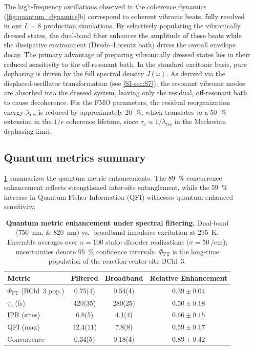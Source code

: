\documentclass[journal=jpcl,manuscript=letter]{achemso}
\begin{document}
The high-frequency oscillations observed in the coherence dynamics (\cref{fig:quantum_dynamics}b) correspond to coherent vibronic beats, fully resolved in our $L=8$ production simulations. By selectively populating the vibronically dressed states, the dual-band filter enhances the amplitude of these beats while the dissipative environment (Drude--Lorentz bath) drives the overall envelope decay. The primary advantage of preparing vibronically dressed states lies in their reduced sensitivity to the off-resonant bath. In the standard excitonic basis, pure dephasing is driven by the full spectral density $J(\omega)$. As derived via the displaced-oscillator transformation (see \cref{SI-sec:S7}), the resonant vibronic modes are absorbed into the dressed system, leaving only the residual, off-resonant bath to cause decoherence. For the FMO parameters, the residual reorganization energy $\lambda_{\mathrm{res}}$ is reduced by approximately \SI{20}{\percent}, which translates to a \SI{50}{\percent} extension in the $1/e$ coherence lifetime, since $\tau_c \propto 1/\lambda_{\mathrm{res}}$ in the Markovian dephasing limit.

\subsection*{Quantum metrics summary}

\cref{tab:quantum_metrics} summarizes the quantum metric enhancements. The \SI{89}{\percent} concurrence enhancement reflects strengthened inter-site entanglement, while the \SI{59}{\percent} increase in Quantum Fisher Information (QFI) witnesses quantum-enhanced sensitivity.

\begin{table}[htpb]
\centering
\caption{\textbf{Quantum metric enhancement under spectral filtering.} Dual-band (\SIlist{750;820}{\nano\meter}) vs.\ broadband impulsive excitation at \SI{295}{\kelvin}. Ensemble averages over $n=100$ static disorder realizations ($\sigma = \SI{50}{\per\centi\meter}$); uncertainties denote \SI{95}{\percent} confidence intervals. $\Phi_{\mathrm{FT}}$ is the long-time population of the reaction-center site BChl~3.}
\label{tab:quantum_metrics}
\begin{tabular}{lccc}
\toprule
\textbf{Metric} & \textbf{Filtered} & \textbf{Broadband} & \textbf{Relative Enhancement} \\
\midrule
$\Phi_{\mathrm{FT}}$ (BChl~3 pop.) & 0.75(4) & 0.54(4) & $0.39 \pm 0.04$ \\
$\tau_c$ (\si{\femto\second}) & 420(35) & 280(25) & $0.50 \pm 0.18$ \\
IPR (sites) & 6.8(5) & 4.1(4) & $0.66 \pm 0.15$ \\
QFI (max) & 12.4(11) & 7.8(8) & $0.59 \pm 0.17$ \\
Concurrence & 0.34(5) & 0.18(4) & $0.89 \pm 0.42$ \\
\bottomrule
\end{tabular}
\end{table}
\end{document}
